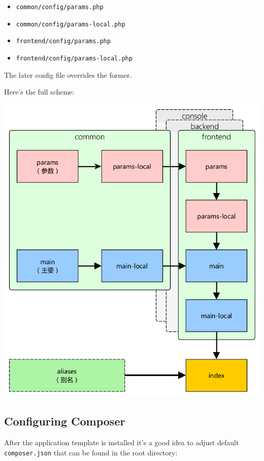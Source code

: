 \begin{itemize}
\item \lstinline|common/config/params.php|
\item \lstinline|common/config/params-local.php|
\item \lstinline|frontend/config/params.php|
\item \lstinline|frontend/config/params-local.php|
\end{itemize}
The later config file overrides the former.

Here's the full scheme:

\noindent\includegraphics[width=\textwidth]{images/advanced-app-configs.png}

\subsection{Configuring Composer}
After the application template is installed it's a good idea to adjust default \lstinline|composer.json| that can be found in the root
directory:

